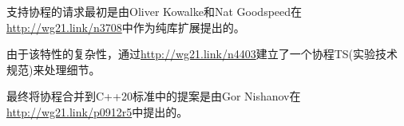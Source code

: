 支持协程的请求最初是由Oliver Kowalke和Nat Goodspeed在\url{http://wg21.link/n3708}中作为纯库扩展提出的。

由于该特性的复杂性，通过\url{http://wg21.link/n4403}建立了一个协程TS(实验技术规范)来处理细节。

最终将协程合并到C++20标准中的提案是由Gor Nishanov在\url{http://wg21.link/p0912r5}中提出的。